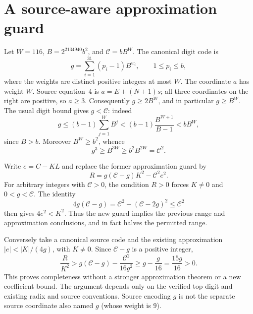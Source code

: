 \section{A source-aware approximation guard}
Let $W=116$, $B=2^{2134940}b^2$, and $\mathcal C=bB^W$.
The canonical digit code is
\[
 g=\sum_{i=1}^{31}(p_i-1)B^{w_i},\qquad
 1\le p_i\le b,
\]
where the weights are distinct positive integers at most $W$.
The coordinate $a$ has weight $W$. Source equation~4 is
$a=E+(N+1)s$; all three coordinates on the right are positive, so
$a\ge3$. Consequently $g\ge2B^W$, and in particular $g\ge B^W$.
The usual digit bound gives $g<\mathcal C$: indeed
\[
 g\le(b-1)\sum_{j=1}^{W}B^j
 < (b-1)\frac{B^{W+1}}{B-1}<bB^W,
\]
since $B>b$. Moreover $B^W\ge b^2$, whence
\[
 g^3\ge B^{3W}\ge b^2B^{2W}=\mathcal C^2.
\]

Write $e=C-KL$ and replace the former approximation guard by
\[
 \boxed{\quad R=g(\mathcal C-g)K^2-\mathcal C^2e^2.\quad}
\]
For arbitrary integers with $\mathcal C>0$, the condition $R>0$
forces $K\ne0$ and $0<g<\mathcal C$. The identity
\[
 4g(\mathcal C-g)=\mathcal C^2-(\mathcal C-2g)^2
 \le\mathcal C^2
\]
then gives $4e^2<K^2$. Thus the new guard implies the previous
range and approximation conclusions, and in fact halves the permitted range.

Conversely take a canonical source code and the existing approximation
$|e|<|K|/(4g)$, with $K\ne0$. Since $\mathcal C-g$ is a positive integer,
\[
 \frac{R}{K^2}
 >g(\mathcal C-g)-\frac{\mathcal C^2}{16g^2}
 \ge g-\frac{g}{16}=\frac{15g}{16}>0.
\]
This proves completeness without a stronger approximation theorem or a new
coefficient bound. The argument depends only on the verified top digit and
existing radix and source conventions. Source encoding $g$ is not the
separate source coordinate also named $g$ (whose weight is $9$).
